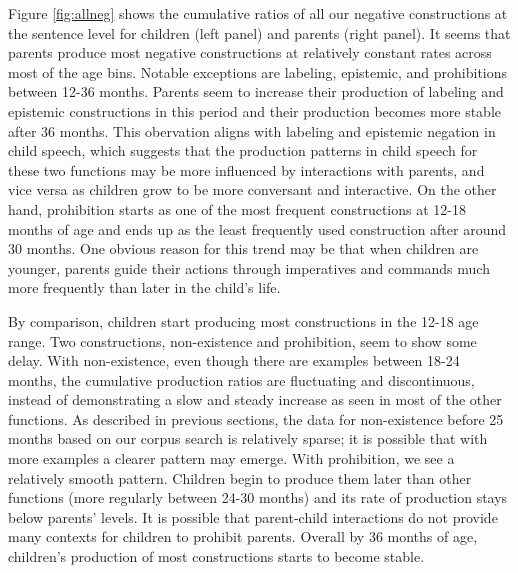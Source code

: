 \documentclass[
  english,
  man,floatsintext]{apa6}
\begin{document}
Figure \ref{fig:allneg} shows the cumulative ratios of all our negative constructions at the sentence level for children (left panel) and parents (right panel).
It seems that parents produce most negative constructions at relatively constant rates across most of the age bins. Notable exceptions are labeling, epistemic, and prohibitions between 12-36 months. Parents seem to increase their production of labeling and epistemic constructions in this period and their production becomes more stable after 36 months. This obervation aligns with labeling and epistemic negation in child speech, which suggests that the production patterns in child speech for these two functions may be more influenced by interactions with parents, and vice versa as children grow to be more conversant and interactive. On the other hand, prohibition starts as one of the most frequent constructions at 12-18 months of age and ends up as the least frequently used construction after around 30 months. One obvious reason for this trend may be that when children are younger, parents guide their actions through imperatives and commands much more frequently than later in the child's life.

By comparison, children start producing most constructions in the 12-18 age range. Two constructions, non-existence and prohibition, seem to show some delay. With non-existence, even though there are examples between 18-24 months, the cumulative production ratios are fluctuating and discontinuous, instead of demonstrating a slow and steady increase as seen in most of the other functions. As described in previous sections, the data for non-existence before 25 months based on our corpus search is relatively sparse; it is possible that with more examples a clearer pattern may emerge. With prohibition, we see a relatively smooth pattern. Children begin to produce them later than other functions (more regularly between 24-30 months) and its rate of production stays below parents' levels. It is possible that parent-child interactions do not provide many contexts for children to prohibit parents. Overall by 36 months of age, children's production of most constructions starts to become stable.
\end{document}
